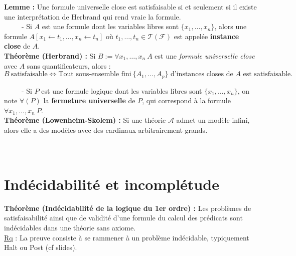 \documentclass[11pt,a4paper]{article}
\begin{document}
\textbf{Lemme :} Une formule universelle close est satisfaisable si et seulement si il existe une interprétation de Herbrand qui rend vraie la formule. \\

\ \ \ \ \ - Si $A$ est une formule dont les variables libres sont $\{x_1,\dots,x_n\}$, alors une formule $A[x_1 \leftarrow t_1, \dots, x_n \leftarrow t_n]$ où $t_1,\dots,t_n \in \mathcal{T}(\mathcal{F})$ est appelée \textbf{instance close} de $A$. \\

\textbf{Théorème (Herbrand) :} Si $B:=\forall x_1,\dots,x_n \ A$ est une \textit{formule universelle close} avec $A$ sans quantificateurs, alors :
\[B \ \text{satisfaisable} \Leftrightarrow \text{Tout sous-ensemble fini} \  \{A_1,\dots,A_p\} \text{ d'instances closes de } A \text{ est satisfaisable.} \]

\ \ \ \ \ - Si $P$ est une formule logique dont les variables libres sont $\{x_1,\dots,x_n\}$, on note $\forall(P)$ la \textbf{fermeture universelle} de $P$, qui correspond à la formule $\forall x_1, \dots , x_n \ P$. \\

\textbf{Théorème (Lowenheim-Skolem) :} Si une théorie $\mathcal{A}$ admet un modèle infini, alors elle a des modèles avec des cardinaux arbitrairement grands. \\ \\ \\

\section{Indécidabilité et incomplétude}

\textbf{Théorème (Indécidabilité de la logique du 1er ordre) :} Les problèmes de satisfaisabilité ainsi que de validité d’une formule du calcul des prédicats sont indécidables dans une théorie sans axiome. \\

\underline{Rq} : La preuve consiste à se rammener à un problème indécidable, typiquement Halt ou Post (cf slides). \\
\end{document}
